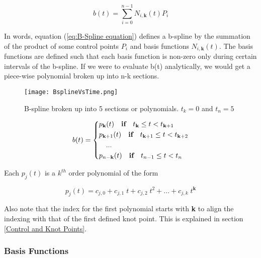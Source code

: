 \documentclass{article}
\begin{document}
  \begin{equation} \label{eq:B-Spline equation}
      b(t) = \sum^{n-1}_{i=0} N_{i,\textbf{k}}(t) P_i
  \end{equation}
 
In words, equation (\ref{eq:B-Spline equation}) defines a b-spline by the summation of the product of some control points \(P_i\) and basis functions \(N_{i,\textbf{k}}(t)\). The basis functions are defined such that each basis function is non-zero only during certain intervals of the b-spline. If we were to evaluate b(t) analytically, we would get a piece-wise polynomial broken up into n-k sections.

\begin{figure}[h]
\begin{center}
\texttt{[image: BsplineVsTime.png]}
\end{center}
\caption{B-spline broken up into 5 sections or polynomials. \(t_k = 0\) and \(t_{n} = 5\)}
\label{Fig:B-splines vs time}
\end{figure}

 \begin{equation}
     b(t) = \begin{dcases} 
                p_{\textbf{k}}(t) \quad \textbf{if} \quad t_{\textbf{k}} \leq t < t_{\textbf{k}+1} \\ 
                p_{\textbf{k}+1}(t) \quad \textbf{if} \quad t_{\textbf{k}+1} \leq t < t_{\textbf{k}+2} \\
                \quad ... \\
                p_{n-\textbf{k}}(t)  \quad \textbf{if} \quad t_{n-1} \leq t < t_{n}
            \end{dcases} 
 \end{equation}

Each \(p_j(t)\) is a \(k^{th}\) order polynomial of the form

\begin{equation}
    p_j(t) = c_{j,0} + c_{j,1} \; t + c_{j,2} \; t^{2} + ... + c_{j,k} \; t^{\textbf{k}}
\end{equation}

Also note that the index for the first polynomial starts with \textbf{k} to align the indexing with that of the first defined knot point. This is explained in section \ref{Control and Knot Points}.

\subsubsection{Basis Functions} \label{sec:Basis Functions}
\end{document}
